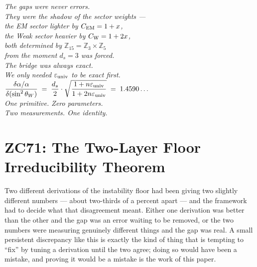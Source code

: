 \documentclass[12pt, a4paper]{article}
\begin{document}
\bigskip
\begin{center}
\textit{%
  The gaps were never errors.\\[0.3em]
  They were the shadow of the sector weights ---\\
  the EM sector lighter by $C_{\rm EM} = 1+x$,\\
  the Weak sector heavier by $C_{\rm W} = 1+2x$,\\
  both determined by $\mathbb{Z}_{15} = \mathbb{Z}_3\times\mathbb{Z}_5$\\
  from the moment $d_s = 3$ was forced.\\[0.5em]
  The bridge was always exact.\\
  We only needed $\varepsilon_{\rm univ}$ to be exact first.\\[0.5em]
  $\displaystyle
    \frac{\delta\alpha/\alpha}{\delta(\sin^2\theta_W)}
    \;=\;
    \frac{d_s}{2}
    \cdot
    \sqrt{\frac{1+n\varepsilon_{\rm univ}}{1+2n\varepsilon_{\rm univ}}}
    \;=\;
    1.4590\ldots
  $\\[0.5em]
  One primitive. Zero parameters.\\
  Two measurements. One identity.
}
\end{center}



\section{ZC71: The Two-Layer Floor Irreducibility Theorem}

Two different derivations of the instability floor had been giving two slightly
different numbers --- about two-thirds of a percent apart --- and the framework
had to decide what that disagreement meant. Either one derivation was better
than the other and the gap was an error waiting to be removed, or the two
numbers were measuring genuinely different things and the gap was real. A small
persistent discrepancy like this is exactly the kind of thing that is tempting
to ``fix'' by tuning a derivation until the two agree; doing so would have been
a mistake, and proving it would be a mistake is the work of this paper.
\end{document}
